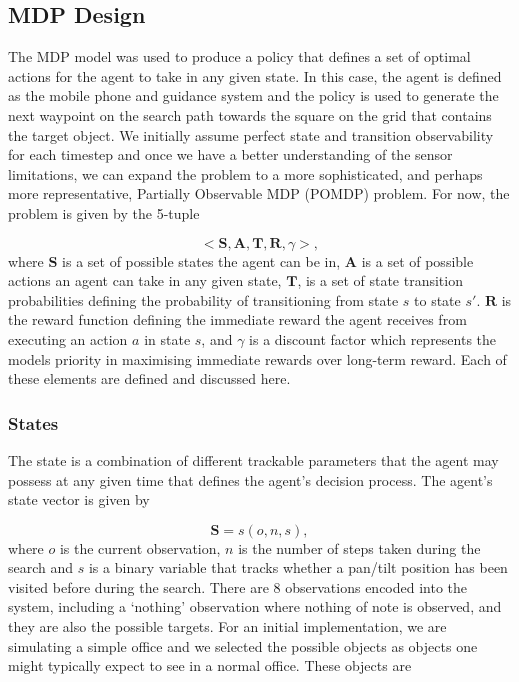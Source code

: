 \documentclass[a4paper, twoside]{article}
\begin{document}
\subsection{MDP Design}

\noindent The MDP model was used to produce a policy that defines a set of optimal actions for the agent to take in any given state. In this case, the agent is defined as the mobile phone and guidance system and the policy is used to generate the next waypoint on the search path towards the square on the grid that contains the target object. We initially assume perfect state and transition observability for each timestep and once we have a better understanding of the sensor limitations, we can expand the problem to a more sophisticated, and perhaps more representative, Partially Observable MDP (POMDP) problem. For now, the problem is given by the 5-tuple

\begin{equation}
  <\mathbf{S}, \mathbf{A}, \mathbf{T}, \mathbf{R}, \gamma>, 
\end{equation}
where $\mathbf{S}$ is a set of possible states the agent can be in, $\mathbf{A}$ is a set of possible actions an agent can take in any given state, $\mathbf{T}$, is a set of state transition probabilities defining the probability of transitioning from state $s$ to state $s'$. $\mathbf{R}$ is the reward function defining the immediate reward the agent receives from executing an action $a$ in state $s$, and $\gamma$ is a discount factor which represents the models priority in maximising immediate rewards over long-term reward. Each of these elements are defined and discussed here.

\subsubsection{States}\label{sec:states}

\noindent The state is a combination of different trackable parameters that the agent may possess at any given time that defines the agent's decision process. The agent's state vector is given by 

\begin{equation}
  \mathbf{S} = s(o, n, s), 
\end{equation}
where $o$ is the current observation, $n$ is the number of steps taken during the search and $s$ is a binary variable that tracks whether a pan/tilt position has been visited before during the search. There are 8 observations encoded into the system, including a `nothing' observation where nothing of note is observed, and they are also the possible targets. For an initial implementation, we are simulating a simple office and we selected the possible objects as objects one might typically expect to see in a normal office. These objects are
\end{document}

